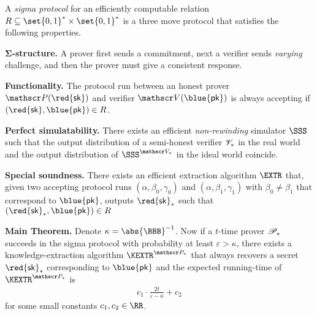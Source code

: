 \documentclass[landscape,footrule]{foils}
\renewcommand{\SK}{{\red{\mathsf{sk}}}}
\renewcommand{\PK}{{\blue{\mathsf{pk}}}}
\begin{document}
\titlefoil





A \emph{sigma protocol} for an efficiently computable relation
$R\subseteq\set{0,1}^*\times\set{0,1}^*$ is a three move
protocol that satisfies the following properties.
\begin{triangles}
\item\textbf{$\boldsymbol{\Sigma}$-structure.} A prover first sends a
  commitment, next a verifier sends \emph{varying} challenge, and
  then the prover must give a consistent response.
\item \textbf{Functionality.} The protocol run between an honest
  prover $\PROVER(\SK)$ and verifier $\VERIFIER(\PK)$ is always
  accepting if $(\SK,\PK)\in R$.
\end{triangles}


\Bigskip

\begin{triangles}
\item \textbf{Perfect simulatability.} There exists an efficient
  \emph{non-rewinding} simulator $\SSS$ such that the output
  distribution of a semi-honest verifier $\mathscr{V}_*$ in the real
  world and the output distribution of $\SSS^{\VERIFIER_*}$ in the
  ideal world coincide.
\item \textbf{Special soundness.} There exists an efficient extraction
  algorithm $\EXTR$ that, given two accepting protocol runs
  $(\alpha,\beta_0,\gamma_0)$ and $(\alpha,\beta_1,\gamma_1)$ with
  $\beta_0\neq \beta_1$ that correspond to $\PK$, outputs $\SK_*$ such
  that $(\SK_*,\PK)\in R$

\end{triangles}



\textbf{Main Theorem.} Denote $\kappa=\abs{\BBB}^{-1}$. Now if a
$t$-time prover $\mathscr{P}_*$ succeeds in the sigma protocol with
probability at least $\varepsilon>\kappa$, there exists a
knowledge-extraction algorithm $\KEXTR^{\PROVER_*}$ that always
recovers a secret $\SK_*$ corresponding to $\PK$ and the expected
running-time of $\KEXTR^{\PROVER_*}$ is
\begin{align*}
  c_1\cdot\frac{2t}{\varepsilon-\kappa}+c_2
\end{align*}
for some small constants $ c_1,c_2\in\RR$. 
\Bigskip
\end{document}

